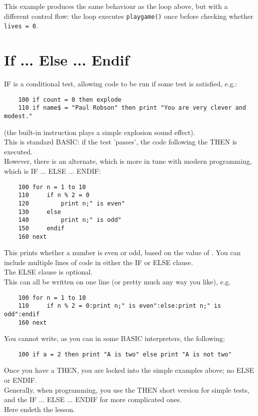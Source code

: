 This example produces the same behaviour as the  loop above, but with a different control flow: the loop executes \texttt{playgame()} once before checking whether \texttt{lives = 0}.

\section{If ... Else ... Endif}

IF is a conditional test, allowing code to be run if some test is satisfied, e.g.:

\begin{verbatim}
	100 if count = 0 then explode
	110 if name$ = "Paul Robson" then print "You are very clever and modest."
\end{verbatim}

(the built-in instruction  plays a simple explosion sound effect).\\

This is standard BASIC: if the test 'passes', the code following the THEN is executed.\\

However, there is an alternate, which is more in tune with modern programming, which is IF ... ELSE ... ENDIF:

\begin{verbatim}
	100 for n = 1 to 10
	110 	if n % 2 = 0
	120    		print n;" is even"
	130 	else
	140    		print n;" is odd"
	150 	endif
	160 next
\end{verbatim}

This prints whether a number is even or odd, based on the value of . You can include multiple lines of code in either the IF or ELSE clause.\\

The ELSE clause is optional.\\

This can all be written on one line (or pretty much any way you like), e.g. \\

\begin{verbatim}
	100 for n = 1 to 10
	110 	if n % 2 = 0:print n;" is even":else:print n;" is odd":endif
	160 next
\end{verbatim}

You cannot write, as you can in some BASIC interpreters, the following:

\begin{verbatim}
	100 if a = 2 then print "A is two" else print "A is not two"
\end{verbatim}

Once you have a THEN, you are locked into the simple examples above; no ELSE or ENDIF.\\

Generally, when programming, you use the THEN short version for simple tests, and the IF ... ELSE ... ENDIF for more complicated ones.\\

Here endeth the lesson.

